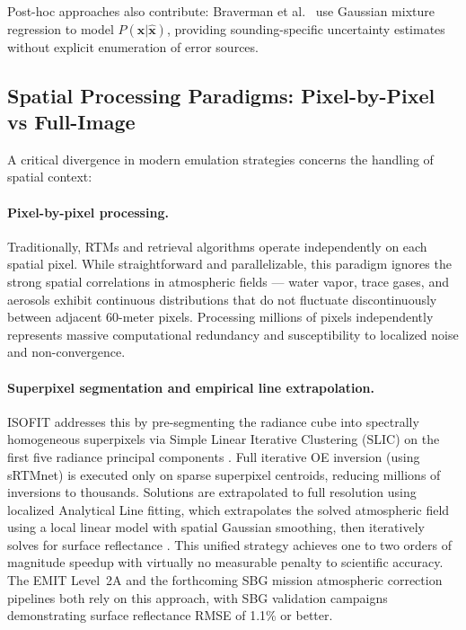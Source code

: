 \documentclass[11pt]{report}
\begin{document}
Post-hoc approaches also contribute: Braverman et al.\ \cite{braverman2021} use Gaussian mixture regression to model $P(\mathbf{x}|\hat{\mathbf{x}})$, providing sounding-specific uncertainty estimates without explicit enumeration of error sources.

\subsection{Spatial Processing Paradigms: Pixel-by-Pixel vs Full-Image}
\label{sec:spatial_paradigms}

A critical divergence in modern emulation strategies concerns the handling of spatial context:

\paragraph{Pixel-by-pixel processing.}
Traditionally, RTMs and retrieval algorithms operate independently on each spatial pixel. While straightforward and parallelizable, this paradigm ignores the strong spatial correlations in atmospheric fields --- water vapor, trace gases, and aerosols exhibit continuous distributions that do not fluctuate discontinuously between adjacent 60-meter pixels. Processing millions of pixels independently represents massive computational redundancy and susceptibility to localized noise and non-convergence.

\paragraph{Superpixel segmentation and empirical line extrapolation.}
ISOFIT addresses this by pre-segmenting the radiance cube into spectrally homogeneous superpixels via Simple Linear Iterative Clustering (SLIC) on the first five radiance principal components \cite{emit_l2a_atbd}. Full iterative OE inversion (using sRTMnet) is executed only on sparse superpixel centroids, reducing millions of inversions to thousands. Solutions are extrapolated to full resolution using localized Analytical Line fitting, which extrapolates the solved atmospheric field using a local linear model with spatial Gaussian smoothing, then iteratively solves for surface reflectance \cite{emit_l2a_atbd}. This unified strategy achieves one to two orders of magnitude speedup with virtually no measurable penalty to scientific accuracy. The EMIT Level~2A and the forthcoming SBG mission atmospheric correction pipelines both rely on this approach, with SBG validation campaigns demonstrating surface reflectance RMSE of 1.1\% or better.
\end{document}
